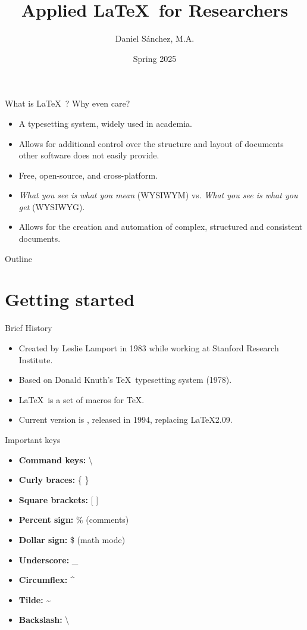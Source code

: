\documentclass[t,12pt,xcolor=dvipsnames]{beamer}
\title[Applied \LaTeX]{Applied \LaTeX \ for Researchers}
\author{Daniel Sánchez, M.A.}
\institute[LIDE]{Laboratorio de Investigación para el Desarrollo del Ecuador}
\date{Spring 2025}
\begin{document}
\begin{frame}
    \titlepage
\end{frame}



\begin{frame}{What is \LaTeX \ ? Why even care?}
    \begin{itemize}
    \item A typesetting system, widely used in academia.
    \item Allows for additional control over the structure and layout of documents other software does not easily provide.
    \item Free, open-source, and cross-platform.
    \item \textit{What you see is what you mean} (WYSIWYM) vs. \textit{What you see is what you get} (WYSIWYG). %
    \item Allows for the creation and automation of complex, structured and consistent documents.
    \end{itemize}
\end{frame}

\begin{frame}{Outline}
    \tableofcontents
\end{frame}

\section{Getting started}

\begin{frame}{Brief History}
    \begin{itemize}
        \item Created by Leslie Lamport in 1983 while working at Stanford Research Institute.
        \item Based on Donald Knuth's \TeX \ typesetting system (1978).
        \item \LaTeX \ is a set of macros for \TeX.
        \item Current version is \LaTeXe, released in 1994, replacing \LaTeX 2.09.
    \end{itemize}
\end{frame}

\begin{frame}{Important keys}
    \begin{itemize}
        \item \textbf{Command keys:} \textbackslash
        \item \textbf{Curly braces:} \{ \}
        \item \textbf{Square brackets:} [ ]
        \item \textbf{Percent sign:} \% (comments)
        \item \textbf{Dollar sign:} \$ (math mode)
        \item \textbf{Underscore:} \_
        \item \textbf{Circumflex:} \^{}
        \item \textbf{Tilde:} \~{}
        \item \textbf{Backslash:} \textbackslash
\end{itemize}
\end{frame}
\end{document}
